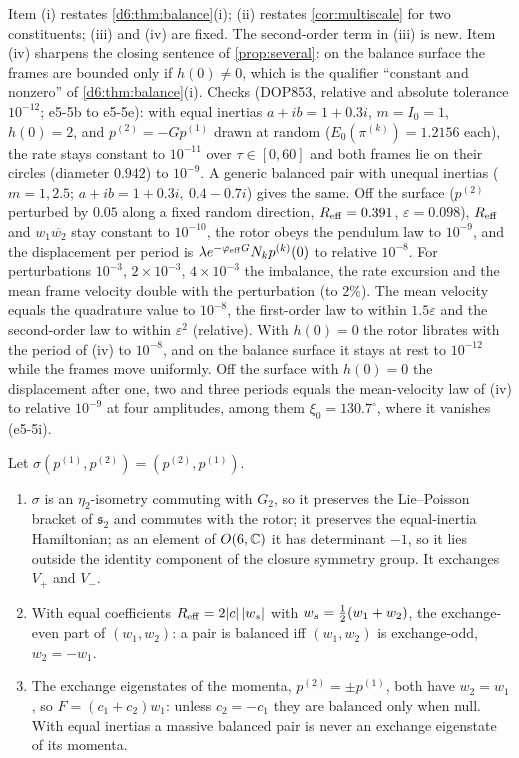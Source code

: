 Item (i) restates \cref{d6:thm:balance}(i); (ii) restates \cref{cor:multiscale} for two constituents; (iii) and (iv) are fixed. The
second-order term in (iii) is new. Item (iv) sharpens the closing sentence of \cref{prop:several}: on the balance surface the frames are
bounded only if $h(0)\neq0$, which is the qualifier ``constant and nonzero'' of \cref{d6:thm:balance}(i). Checks (DOP853, relative and absolute
tolerance $10^{-12}$; e5-5b to e5-5e): with equal inertias $a+ib=1+0.3i$, $m=I_0=1$, $h(0)=2$, and $p^{(2)}=-Gp^{(1)}$ drawn at random
($E_0(\pi^{(k)})=1.2156$ each), the rate stays constant to $10^{-11}$ over $\tau\in[0,60]$ and both frames lie on their circles (diameter $0.942$) to
$10^{-9}$. A generic balanced pair with unequal inertias ($m=1,2.5$; $a+ib=1+0.3i,\ 0.4-0.7i$) gives the same. Off the surface ($p^{(2)}$ perturbed by
$0.05$ along a fixed random direction, $R_{\rm eff}=0.391$, $\varepsilon=0.098$), $R_{\rm eff}$ and $w_1\overline{w_2}$ stay constant to $10^{-10}$, the
rotor obeys the pendulum law to $10^{-9}$, and the displacement per period is $\lambda e^{-\varphi_{\rm eff}G}N_kp^{(k)}(0)$ to relative $10^{-8}$. For
perturbations $10^{-3}$, $2\times10^{-3}$, $4\times10^{-3}$ the imbalance, the rate excursion and the mean frame velocity double with the perturbation (to
$2\%$). The mean velocity equals the quadrature value to $10^{-8}$, the first-order law to within $1.5\varepsilon$ and the second-order law to within
$\varepsilon^2$ (relative). With $h(0)=0$ the rotor librates with the period of (iv) to $10^{-8}$, and on the balance surface it stays at rest to
$10^{-12}$ while the frames move uniformly. Off the surface with $h(0)=0$ the displacement after one, two and three periods equals
the mean-velocity law of (iv) to relative $10^{-9}$ at four amplitudes, among them $\xi_0=130.7^\circ$, where it vanishes (e5-5i).

\begin{proposition}
\label{e5:prop:exchange}
Let $\sigma(p^{(1)},p^{(2)})=(p^{(2)},p^{(1)})$.
\begin{enumerate}[label=(\roman*),leftmargin=2.2em]
\item $\sigma$ is an $\eta_2$-isometry commuting with $G_2$, so it preserves the Lie--Poisson bracket of $\mathfrak s_2$ and commutes with the rotor; it
preserves the equal-inertia Hamiltonian; as an element of $O(6,\mathbb{C})$ it has determinant $-1$, so it lies outside the identity component of the closure
symmetry group. It exchanges $V_+$ and $V_-$.
\item With equal coefficients $R_{\rm eff}=2|c|\,|w_s|$ with $w_s=\tfrac12(w_1+w_2)$, the exchange-even part of $(w_1,w_2)$: a pair is balanced iff
$(w_1,w_2)$ is exchange-odd, $w_2=-w_1$.
\item The exchange eigenstates of the momenta, $p^{(2)}=\pm p^{(1)}$, both have $w_2=w_1$, so $F=(c_1+c_2)w_1$: unless $c_2=-c_1$ they are
balanced only when null. With equal inertias a massive balanced pair is never an exchange eigenstate of its momenta.
\end{enumerate}
\end{proposition}

